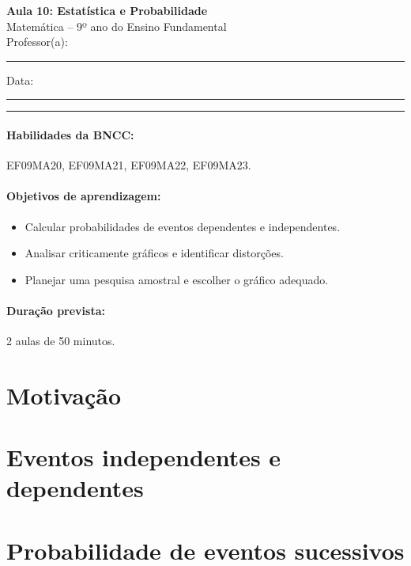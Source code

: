 \documentclass[11pt,a4paper]{article}
\newcommand{\numaula}{10}
\newcommand{\tituloaula}{Estatística e Probabilidade}
\begin{document}
\begin{center}
  {\Large\bfseries Aula \numaula: \tituloaula}\\[4pt]
  {\large Matemática -- 9º ano do Ensino Fundamental}\\[2pt]
  Professor(a): \rule{6cm}{0.4pt} \qquad Data: \rule{3cm}{0.4pt}
\end{center}
\noindent\rule{\linewidth}{0.8pt}

\paragraph{Habilidades da BNCC:} EF09MA20, EF09MA21, EF09MA22, EF09MA23.

\paragraph{Objetivos de aprendizagem:}
\begin{itemize}[nosep]
  \item Calcular probabilidades de eventos dependentes e independentes.
  \item Analisar criticamente gráficos e identificar distorções.
  \item Planejar uma pesquisa amostral e escolher o gráfico adequado.
\end{itemize}

\paragraph{Duração prevista:} 2 aulas de 50 minutos. %

\section{Motivação}

\section{Eventos independentes e dependentes}

\section{Probabilidade de eventos sucessivos}
\end{document}
